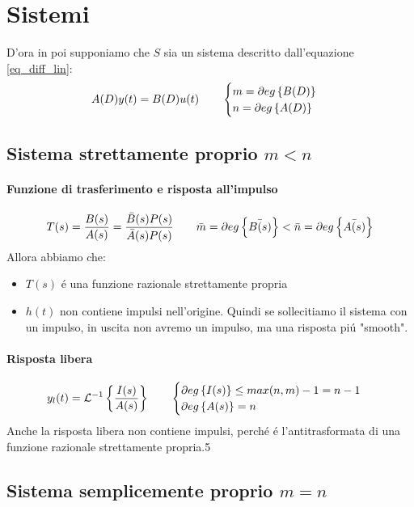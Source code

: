 \documentclass[../main.tex]{subfiles}
\begin{document}
	\section{Sistemi}
	D'ora in poi supponiamo che $ S $ sia un sistema descritto dall'equazione \ref{eq_diff_lin}:
	\[ A(D) y(t) = B(D) u(t) \qquad \begin{cases}m = \partial eg \left\lbrace B(D) \right\rbrace\\ n=\partial eg \left\lbrace A(D) \right\rbrace\end{cases}\]
	\subsection{Sistema strettamente proprio $ m < n $}
	\paragraph{Funzione di trasferimento e risposta all'impulso}
	\[ T(s) = \frac{B(s)}{A(s)} = \frac{\bar{B}(s) P(s)}{\bar{A}(s) P(s)} \qquad \bar{m} = \partial eg \left\lbrace \bar{B(s)} \right\rbrace < \bar{n} = \partial eg \left\lbrace \bar{A(s)} \right\rbrace \]
	Allora abbiamo che:
	\begin{itemize}
		\item $ T(s) $ \'{e} una funzione razionale strettamente propria
		\item $ h(t) $ non contiene impulsi nell'origine. Quindi se sollecitiamo il sistema con un impulso, in uscita non avremo un impulso, ma una risposta pi\'{u} "smooth".
	\end{itemize}
	\paragraph{Risposta libera}
	\[ y_l(t) = \mathcal{L}^{-1} \left\lbrace \frac{I(s)}{A(s)} \right\rbrace \qquad \begin{cases} \partial eg \left\lbrace I(s) \right\rbrace \leq max(n,m) - 1 = n-1\\ \partial eg \left\lbrace A(s) \right\rbrace = n \end{cases} \]
	Anche la risposta libera non contiene impulsi, perch\'e \'e l'antitrasformata di una funzione razionale strettamente propria.5 
	\subsection{Sistema semplicemente proprio $ m = n $}
\end{document}
